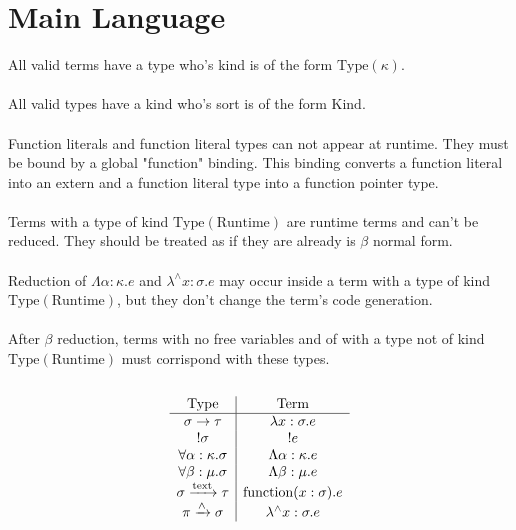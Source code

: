\documentclass {article}
\begin{document}
\tableofcontents


\section{Main Language}

All valid terms have a type who's kind is of the form $ \text{Type} (\kappa) $. \\
\\
All valid types have a kind who's sort is of the form $ \text{Kind} $.\\
\\
Function literals and function literal types can not appear at runtime. They must be bound by a global "function" binding.
This binding converts a function literal into an extern and a function literal type into a function pointer type. \\
\\
Terms with a type of kind $ \text{Type} (\text{Runtime}) $ are runtime terms and can't be reduced.
They should be treated as if they are already is $ \beta $ normal form. \\
\\
Reduction of $ \Lambda \alpha : \kappa. e $ and $ \lambda^\wedge x : \sigma. e $ may occur inside a term with a type of kind $ \text{Type} (\text{Runtime}) $,
but they don't change the term's code generation. \\
\\
After $ \beta $ reduction, terms with no free variables and of with a type not of kind $ \text{Type} (\text{Runtime}) $ must corrispond with these types. \\
\\

\begin{gather*}
\begin{array}{c | c}
\text{Type} & \text{Term} \\
\hline
\sigma \to \tau & \lambda x : \sigma. e \\
!\sigma & !e \\
\forall \alpha : \kappa. \sigma & \Lambda \alpha : \kappa. e  \\
\forall \beta : \mu. \sigma & \Lambda \beta : \mu. e \\
\sigma \xrightarrow{\text{text}} \tau & \text{function}(x : \sigma). e \\
\pi \xrightarrow{\wedge} \sigma & \lambda^\wedge x : \sigma. e
\end{array}
\\
\end{gather*}
\end{document}
